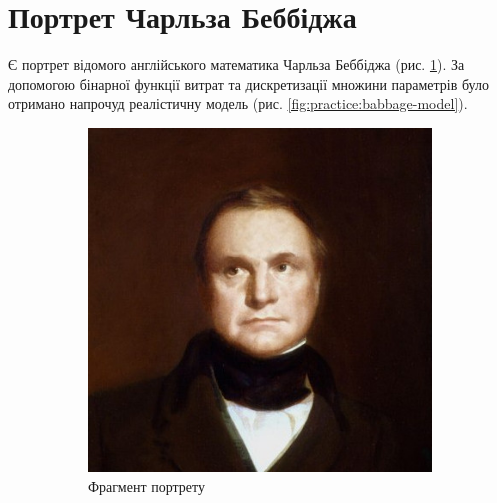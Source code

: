 \section{Портрет Чарльза Беббіджа}

Є портрет відомого англійського математика Чарльза Беббіджа
(рис. \ref{fig:practice:babbage}).
За допомогою бінарної функції витрат та дискретизації множини параметрів
було отримано напрочуд реалістичну модель
(рис. \ref{fig:practice:babbage-model}).

\begin{figure}[h]
  \centering
  \begin{subfigure}[b]{0.4\textwidth}
    \centering
    \includegraphics[width=\textwidth]{images/babbage}
    \caption{Фрагмент портрету}
    \label{fig:practice:babbage}
  \end{subfigure}
  \begin{subfigure}[b]{0.4\textwidth}
    \centering

\end{subfigure}
\end{figure}
